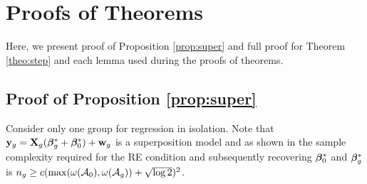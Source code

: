 \section{Proofs of Theorems}
\label{sec:dsproofs}
Here, we present proof of Proposition \ref{prop:super} and  full proof for Theorem \ref{theo:step} and each lemma used during the proofs of theorems. %
\subsection{Proof of Proposition \ref{prop:super}}
\begin{IEEEproof}
	Consider only one group for regression in isolation. 
	Note that $\mathbf{y}_g = \mathbf{X}_g (\boldsymbol{\beta} _g^* + \boldsymbol{\beta} _0^*) + \mathbf{w}_g$ is a superposition model and as shown in \cite{guba16} the sample complexity required for the RE condition and subsequently recovering $\boldsymbol{\beta} _0^*$ and $\boldsymbol{\beta} _g^*$ is $n_g  \geq c(\max(\omega(\cA_0), \omega(\cA_g) ) + \sqrt{\log 2})^2$.
\end{IEEEproof} 

